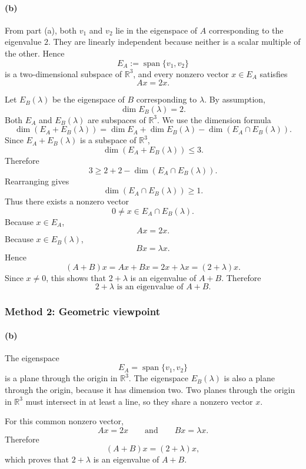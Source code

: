 \documentclass[12pt]{article}
\newcommand{\R}{\mathbb{R}}
\newcommand{\Span}{\operatorname{span}}
\begin{document}
\paragraph{(b)}
From part (a), both $v_1$ and $v_2$ lie in the eigenspace of $A$ corresponding to the eigenvalue $2$. They are linearly independent because neither is a scalar multiple of the other. Hence
\[
E_A:=\Span\{v_1,v_2\}
\]
is a two-dimensional subspace of $\R^3$, and every nonzero vector $x\in E_A$ satisfies
\[
Ax=2x.
\]

Let $E_B(\lambda)$ be the eigenspace of $B$ corresponding to $\lambda$. By assumption,
\[
\dim E_B(\lambda)=2.
\]
Both $E_A$ and $E_B(\lambda)$ are subspaces of $\R^3$. We use the dimension formula
\[
\dim(E_A+E_B(\lambda))
=\dim E_A+
\dim E_B(\lambda)-\dim(E_A\cap E_B(\lambda)).
\]
Since $E_A+E_B(\lambda)$ is a subspace of $\R^3$,
\[
\dim(E_A+E_B(\lambda))\le3.
\]
Therefore
\[
3\ge 2+2-\dim(E_A\cap E_B(\lambda)).
\]
Rearranging gives
\[
\dim(E_A\cap E_B(\lambda))\ge1.
\]
Thus there exists a nonzero vector
\[
0\neq x\in E_A\cap E_B(\lambda).
\]
Because $x\in E_A$,
\[
Ax=2x.
\]
Because $x\in E_B(\lambda)$,
\[
Bx=\lambda x.
\]
Hence
\[
(A+B)x=Ax+Bx=2x+\lambda x=(2+\lambda)x.
\]
Since $x\neq0$, this shows that $2+\lambda$ is an eigenvalue of $A+B$. Therefore
\[
\boxed{2+
\lambda\text{ is an eigenvalue of }A+B.}
\]

\subsubsection{Method 2: Geometric viewpoint}

\paragraph{(b)}
The eigenspace
\[
E_A=\Span\{v_1,v_2\}
\]
is a plane through the origin in $\R^3$. The eigenspace $E_B(\lambda)$ is also a plane through the origin, because it has dimension two. Two planes through the origin in $\R^3$ must intersect in at least a line, so they share a nonzero vector $x$.

For this common nonzero vector,
\[
Ax=2x
\qquad\text{and}\qquad
Bx=\lambda x.
\]
Therefore
\[
(A+B)x=(2+
\lambda)x,
\]
which proves that $2+
\lambda$ is an eigenvalue of $A+B$.
\end{document}
